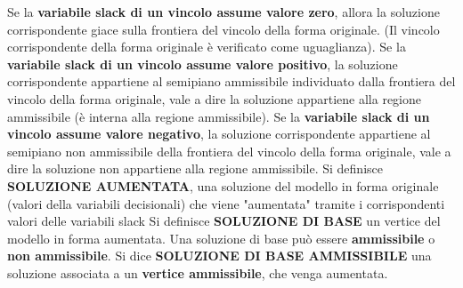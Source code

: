 \documentclass[12pt]{article}
\begin{document}
Se la \textbf{variabile slack di un vincolo assume valore zero}, allora la soluzione corrispondente giace sulla frontiera del vincolo della forma originale. (Il vincolo corrispondente della forma originale è verificato come uguaglianza). \newline
Se la \textbf{variabile slack di un vincolo assume valore positivo}, la soluzione corrispondente appartiene al semipiano ammissibile individuato dalla frontiera del vincolo della forma originale, vale a dire la soluzione appartiene alla regione ammissibile (è interna alla regione ammissibile). \newline
Se la \textbf{variabile slack di un vincolo assume valore negativo}, la soluzione corrispondente appartiene al semipiano non ammissibile della frontiera del vincolo della forma originale, vale a dire la soluzione non appartiene alla regione ammissibile. \newline
Si definisce \textbf{SOLUZIONE AUMENTATA}, una soluzione del modello in forma originale (valori della variabili decisionali) che viene "aumentata" tramite i corrispondenti valori delle variabili slack \newline
Si definisce \textbf{SOLUZIONE DI BASE} un vertice del modello in forma aumentata. Una soluzione di base può essere \textbf{ammissibile} o \textbf{non ammissibile}.
Si dice \textbf{SOLUZIONE DI BASE AMMISSIBILE} una soluzione associata a un \textbf{vertice ammissibile}, che venga aumentata.
\end{document}
